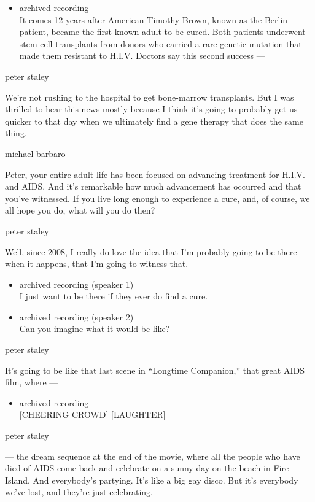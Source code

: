 \begin{itemize}
\tightlist
\item
  archived recording\\
  It comes 12 years after American Timothy Brown, known as the Berlin
  patient, became the first known adult to be cured. Both patients
  underwent stem cell transplants from donors who carried a rare genetic
  mutation that made them resistant to H.I.V. Doctors say this second
  success ---
\end{itemize}

peter staley

We're not rushing to the hospital to get bone-marrow transplants. But I
was thrilled to hear this news mostly because I think it's going to
probably get us quicker to that day when we ultimately find a gene
therapy that does the same thing.

michael barbaro

Peter, your entire adult life has been focused on advancing treatment
for H.I.V. and AIDS. And it's remarkable how much advancement has
occurred and that you've witnessed. If you live long enough to
experience a cure, and, of course, we all hope you do, what will you do
then?

peter staley

Well, since 2008, I really do love the idea that I'm probably going to
be there when it happens, that I'm going to witness that.

\begin{itemize}
\item
  archived recording (speaker 1)\\
  I just want to be there if they ever do find a cure.
\item
  archived recording (speaker 2)\\
  Can you imagine what it would be like?
\end{itemize}

peter staley

It's going to be like that last scene in ``Longtime Companion,'' that
great AIDS film, where ---

\begin{itemize}
\tightlist
\item
  archived recording\\
  {[}CHEERING CROWD{]} {[}LAUGHTER{]}
\end{itemize}

peter staley

--- the dream sequence at the end of the movie, where all the people who
have died of AIDS come back and celebrate on a sunny day on the beach in
Fire Island. And everybody's partying. It's like a big gay disco. But
it's everybody we've lost, and they're just celebrating.

